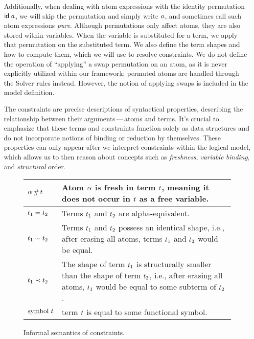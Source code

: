 \documentclass[english, mgr]{iithesis}
\renewcommand{\it}[1]{\textit{#1}}
\newcommand{\mdash}{\,---\,}
\def\-{{\mdash}}
\begin{document}
Additionally, when dealing with atom expressions with the identity permutation $\mathsf{id} \;a$,
we will skip the permutation and simply write $a$,
and sometimes call such atom expressions \it{pure}.
Although permutations only affect atoms, they are also stored within variables.
When the variable is substituted for a term, we apply that permutation
on the substituted term.
We also define the term shapes and how to compute them, which
we will use to resolve constraints.
We do not define the operation of ``applying'' a swap permutation on
an atom, as it is never explicitly utilized within our framework;
permuted atoms are handled through the Solver rules instead.
However, the notion of applying swaps is included in the
model definition.

The constraints are precise descriptions of syntactical properties,
describing the relationship between their arguments\-atoms and terms.
It's crucial to emphasize that these terms and constraints function
solely as data structures and do not incorporate notions of binding or reduction by themselves.
These properties can only appear after we interpret
constraints within the logical model, which allows us to then reason about
concepts such as \it{freshness}, \it{variable binding}, and \it{structural} order.
\begin{figure}[hbtp]
  \centering
  \begin{tabularx}{\linewidth}{|l|X|}
    \hline
    $\alpha \,\#\, t$ & Atom $\alpha$ is fresh in term $t$, meaning it does not occur in $t$ as a free variable. \\
    \hline
    $t_1 = t_2$ & Terms $t_1$ and $t_2$ are alpha-equivalent. \\
    \hline
    $t_1 \sim t_2$ & Terms $t_1$ and $t_2$ possess an identical shape, i.e., after erasing all atoms, terms $t_1$ and $t_2$ would be equal. \\
    \hline
    $t_1 \prec t_2$ & The shape of term $t_1$ is structurally smaller than the shape of term $t_2$, i.e., after erasing all atoms, $t_1$ would be equal to some subterm of $t_2$. \\
    \hline
    $\text{symbol } t$ & term $t$ is equal to some functional symbol. \\
    \hline
  \end{tabularx}
  \caption{Informal semantics of constraints.}
  \label{fig:informal-constraints-semantics}
\end{figure}
\end{document}
